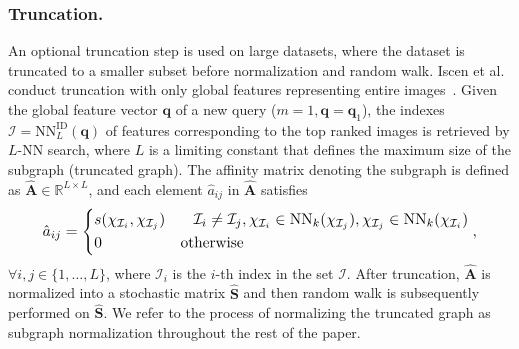 \documentclass[letterpaper]{article} \usepackage{aaai19}  \usepackage{times}  \usepackage{helvet}  \usepackage{courier}  \usepackage{url}  \usepackage{graphicx}  \frenchspacing  \setlength{\pdfpagewidth}{8.5in}  \setlength{\pdfpageheight}{11in}
\begin{document}
\subsubsection{Truncation.}
An optional truncation step is used on large datasets, where the dataset is truncated to a smaller subset before normalization and random walk.
Iscen et al. conduct truncation with only global features representing entire images~\cite{iscen2017efficient}.
Given the global feature vector $\mathbf{q}$ of a new query ($m=1, \mathbf{q}=\mathbf{q}_1$), the indexes $\mathcal{I}=\textrm{NN}_L^{\textrm{ID}}(\mathbf{q})$ of features corresponding to the top ranked images is retrieved by $L$-NN search, where $L$ is a limiting constant that defines the maximum size of the subgraph (truncated graph).
The affinity matrix denoting the subgraph is defined as $\hat{\mathbf{A}}\in\mathbb{R}^{L\times L}$, and each element $\hat{a}_{ij}$ in $\hat{\mathbf{A}}$ satisfies
\begin{equation}
\resizebox{.9\hsize}{!}{$
\hat{a}_{ij} =
\left\{
\begin{aligned}
  & s(\chi_{\mathcal{I}_i}, \chi_{\mathcal{I}_j}) & \mathcal{I}_i \neq \mathcal{I}_j, \chi_{\mathcal{I}_i} \in \textrm{NN}_k(\chi_{\mathcal{I}_j}), \chi_{\mathcal{I}_j} \in \textrm{NN}_k(\chi_{\mathcal{I}_i}) \\
  & 0 & \textrm{otherwise} \qquad\qquad\qquad\qquad\qquad\qquad~~~~~~~~
\end{aligned}
\right. ,
$}
\end{equation}
$\forall i,j \in \{1,\dots,L\}$, where $\mathcal{I}_i$ is the $i$-th index in the set $\mathcal{I}$.
After truncation, $\hat{\mathbf{A}}$ is normalized into a stochastic matrix $\hat{\mathbf{S}}$ and then random walk is subsequently performed on $\hat{\mathbf{S}}$.
We refer to the process of normalizing the truncated graph as subgraph normalization throughout the rest of the paper.
\end{document}
